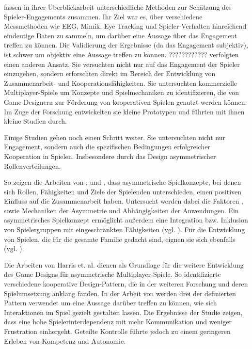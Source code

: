 \cite{rashed_review_2025} fassen in ihrer Überblickarbeit unterschiedliche Methoden zur Schätzung des Spieler-Engagements zusammen. Ihr Ziel war es, über verschiedene Messmethoden wie EEG, Mimik, Eye Tracking und Spieler-Verhalten hinreichend eindeutige Daten zu sammeln, um darüber eine Aussage über das Engagement treffen zu können. Die Validierung der Ergebnisse (da das Engagement subjektiv), ist schwer um objektiv eine  Aussage treffen zu können. \cite{yu_video_2023} ???????????? verfolgten einen anderen Ansatz. Sie versuchten nicht nur auf das Engagement der Spieler einzugehen, sondern erforschten direkt im Bereich der Entwicklung von Zusammenarbeit- und Kooperationsfähigkeiten. Sie untersuchten kommerzielle Multiplayer-Spiele um Konzepte und Spielmechaniken zu identifizieren, die von Game-Designern zur Förderung von kooperativen Spielen genutzt werden können. Im Zuge der Forschung entwickelten sie kleine Prototypen und führten mit ihnen kleine Studien durch. 

Einige Studien gehen noch einen Schritt weiter. Sie untersuchten nicht nur Engagement, sondern auch die spezifischen Bedingungen erfolgreicher Kooperation in Spielen. Insbesondere durch das Design asymmetrischer Rollenverteilungen.

So zeigen die Arbeiten von \cite{harris_beam_2014}, \cite{harris_leveraging_2016} und \cite{harris_asymmetry_2019}, dass asymmetrische Spielkonzepte, bei denen sich Rollen, Fähigkeiten und Ziele der Spielenden unterschieden, einen positiven Einfluss auf die Zusammenarbeit haben. Untersucht werden dabei die Faktoren ,  sowie Mechaniken der Asymmetrie und Abhängigkeiten der Anwendungen. Ein asymmetrisches Spielkonzept ermöglicht außerdem eine Integration bzw. Inklusion von Spielergruppen mit eingeschränkten Fähigkeiten (vgl. \citealp{goncalves_exploring_2021}). Für die Entwicklung von Spielen, die für die gesamte Familie gedacht sind, eignen sie sich ebenfalls (vgl. \citealp{pais_promoting_2024}).

Die Arbeiten von Harris et. al. dienen als Grundlage für die weitere Entwicklung des Game Designs für asymmetrische Multiplayer-Spiele. So identifizierte \cite{guimaraes_rocha_game_2008} verschiedene kooperative Design-Pattern, die in der weiteren Forschung und deren Spielumsetzung anklang fanden. In der Arbeit von \cite{emmerich_impact_2017} werden drei der definierten Pattern verwendet um eine Aussage darüber treffen zu können, wie sich Interaktionen im Spiel gezielt gestalten lassen. Die Ergebnisse der Studie zeigen, dass eine hohe Spielerinterdependenz mit mehr Kommunikation und weniger Frustration einhergeht. Geteilte Kontrolle führte jedoch zu einem geringeren Erleben von Kompetenz und Autonomie.

